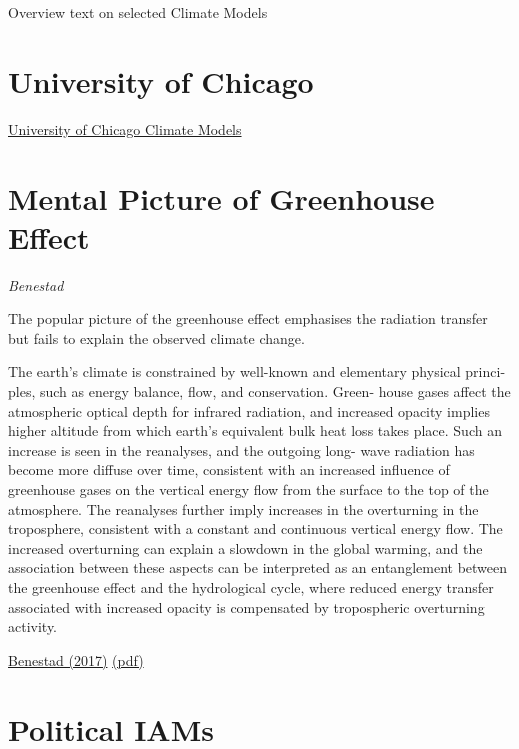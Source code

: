 \documentclass[
]{book}
\begin{document}
Overview text on selected Climate Models

\hypertarget{university-of-chicago}{%
\section{University of Chicago}\label{university-of-chicago}}

\href{http://climatemodels.uchicago.edu/}{University of Chicago Climate Models}

\hypertarget{mental-picture-of-greenhouse-effect}{%
\section{Mental Picture of Greenhouse Effect}\label{mental-picture-of-greenhouse-effect}}

\emph{Benestad}

The popular picture of the greenhouse effect
emphasises the radiation transfer but fails to explain the
observed climate change.

The earth's climate is
constrained by well-known and elementary physical princi-
ples, such as energy balance, flow, and conservation. Green-
house gases affect the atmospheric optical depth for infrared
radiation, and increased opacity implies higher altitude from
which earth's equivalent bulk heat loss takes place. Such an
increase is seen in the reanalyses, and the outgoing long-
wave radiation has become more diffuse over time, consistent
with an increased influence of greenhouse gases on the
vertical energy flow from the surface to the top of the atmosphere.
The reanalyses further imply increases in the overturning
in the troposphere, consistent with a constant and
continuous vertical energy flow. The increased overturning
can explain a slowdown in the global warming, and the
association between these aspects can be interpreted as an
entanglement between the greenhouse effect and the hydrological cycle,
where reduced energy transfer associated with increased opacity
is compensated by tropospheric overturning activity.

\href{https://link.springer.com/article/10.1007/s00704-016-1732-y}{Benestad (2017)}
\href{pdf/Benestad_2017_Mental_Picture_of_Greenhouse_Effect.pdf}{(pdf)}

\hypertarget{political-iams}{%
\section{Political IAMs}\label{political-iams}}
\end{document}
